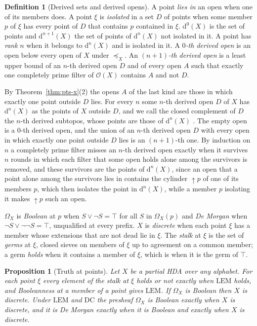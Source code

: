 \documentclass{lmcs}
\newtheorem{proposition}[theorem]{Proposition}
\theoremstyle{definition}
\newtheorem{definition}[theorem]{Definition}
\theoremstyle{remark}
\newcommand{\Op}{\mathcal{O}}
\newcommand{\prin}[1]{\mathrm{#1}}
\newcommand{\EM}{\prin{LEM}}
\newcommand{\fle}[1]{\preceq_{#1}}
\newcommand{\upc}[1]{{\uparrow}#1}
\providecommand{\dset}[2]{\mathrm{d}^{#1}(#2)}
\providecommand{\DC}{\prin{DC}}
\begin{document}
\begin{definition}[Derived sets and derived opens]\label{def:derived}\label{def:dec-derived}
A point \emph{lies in} an open when one of its members does. A point $\xi$ is
\emph{isolated} in a set $D$ of points when some member $p$ of $\xi$ has every point of $D$ that contains $p$
contained in $\xi$. $\dset{0}{X}$ is the set of points and $\dset{n+1}{X}$ the set of points
of $\dset{n}{X}$ not isolated in it. A point has \emph{rank} $n$ when it belongs to
$\dset{n}{X}$ and is isolated in it. A \emph{$0$-th derived open} is an open below every open
of $X$ under $\fle{X}$. An \emph{$(n+1)$-th derived open} is a least upper
bound of an $n$-th derived open $D$ and of every open $A$ such that exactly one completely prime filter of $\Op(X)$
contains $A$ and not $D$.
\end{definition}

By Theorem~\ref{thm:pts-x}(2) the opens $A$ of the last kind are those in which exactly one point outside $D$ lies.
For every $n$ some $n$-th derived open $D$ of $X$ has $\dset{n}{X}$ as the points of $X$ outside
$D$, and we call the closed
complement of $D$ the $n$-th derived subtopos, whose points are those of $\dset{n}{X}$
\cite{CL25b}. The empty open is a $0$-th derived
open, and the union of an $n$-th derived open $D$ with every open in which exactly one point outside $D$ lies is an
$(n+1)$-th one. By induction on $n$ a completely prime filter
misses an $n$-th derived open exactly when it survives $n$ rounds in which each filter that some open holds alone among
the survivors is removed, and these survivors are the points of $\dset{n}{X}$, since
an open that a point alone among the survivors lies in contains the cylinder $\upc{p}$ of one of its members $p$,
which then isolates the point in $\dset{n}{X}$, while a member $p$ isolating it makes $\upc{p}$ such an
open.

$\Omega_X$ is \emph{Boolean} at $p$ when $S\vee\neg S=\top$ for all $S$ in $\Omega_X(p)$ and \emph{De Morgan} when
$\neg S\vee\neg\neg S=\top$, unqualified at every
prefix.
$X$ is \emph{discrete} when each point $\xi$ has a member whose extensions that are not dead lie in
$\xi$. The \emph{stalk} at $\xi$ is the set of \emph{germs} at $\xi$, closed sieves on members of $\xi$
up to agreement on a common member; a germ \emph{holds} when it contains a member of
$\xi$, which is when it is the germ of
$\top$.

\begin{proposition}[Truth at points]\label{thm:setup-truth}
Let $X$ be a partial HDA over any alphabet. For each point $\xi$ every element of the stalk at $\xi$ holds or not
exactly when $\EM$ holds, and Booleanness at a member of a point gives
$\EM$. If $\Omega_X$ is Boolean then $X$ is
discrete. Under $\EM$ and $\DC$ the presheaf $\Omega_X$ is Boolean exactly
when $X$ is discrete, and it is De Morgan exactly when it is Boolean and exactly
when $X$ is discrete.
\end{proposition}
\end{document}
